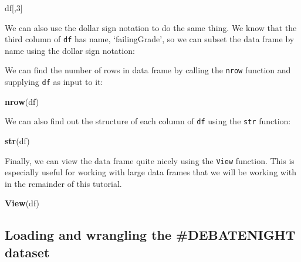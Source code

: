 \documentclass[]{article}
\newenvironment{Shaded}{\begin{snugshade}}{\end{snugshade}}
\newcommand{\DecValTok}[1]{\textcolor[rgb]{0.00,0.00,0.81}{#1}}
\newcommand{\KeywordTok}[1]{\textcolor[rgb]{0.13,0.29,0.53}{\textbf{#1}}}
\newcommand{\NormalTok}[1]{#1}
\newcommand{\OperatorTok}[1]{\textcolor[rgb]{0.81,0.36,0.00}{\textbf{#1}}}
\begin{document}
\begin{Shaded}
\begin{Highlighting}[]
\NormalTok{df[,}\DecValTok{3}\NormalTok{]}
\end{Highlighting}
\end{Shaded}

We can also use the dollar sign notation to do the same thing. We know
that the third column of \texttt{df} has name, `failingGrade', so we can
subset the data frame by name using the dollar sign notation:

\begin{Shaded}
\end{Shaded}

We can find the number of rows in data frame by calling the
\texttt{nrow} function and supplying \texttt{df} as input to it:

\begin{Shaded}
\begin{Highlighting}[]
\KeywordTok{nrow}\NormalTok{(df)}
\end{Highlighting}
\end{Shaded}

We can also find out the structure of each column of \texttt{df} using
the \texttt{str} function:

\begin{Shaded}
\begin{Highlighting}[]
\KeywordTok{str}\NormalTok{(df)}
\end{Highlighting}
\end{Shaded}

Finally, we can view the data frame quite nicely using the \texttt{View}
function. This is especially useful for working with large data frames
that we will be working with in the remainder of this tutorial.

\begin{Shaded}
\begin{Highlighting}[]
\KeywordTok{View}\NormalTok{(df)}
\end{Highlighting}
\end{Shaded}

\hypertarget{loading-and-wrangling-the-debatenight-dataset}{%
\subsection{Loading and wrangling the \#DEBATENIGHT
dataset}\label{loading-and-wrangling-the-debatenight-dataset}}
\end{document}
